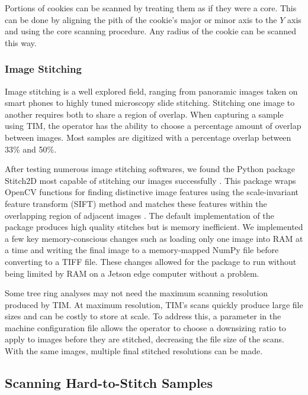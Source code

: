 \documentclass[a4paper,12pt]{article}
\begin{document}
Portions of cookies can be scanned by treating them as if they were a core. This can be done by aligning the pith of the cookie's major or minor axis to the $Y$ axis and using the core scanning procedure. Any radius of the cookie can be scanned this way.

\subsubsection{Image Stitching}

Image stitching is a well explored field, ranging from panoramic images taken on smart phones to highly tuned microscopy slide stitching. 
Stitching one image to another requires both to share a region of overlap. When capturing a sample using TIM, the operator has the ability to choose a percentage amount of overlap between images.
Most samples are digitized with a percentage overlap between 33\% and 50\%.

After testing numerous image stitching softwares, we found the Python package Stitch2D most capable of stitching our images successfully \citep{mansur_stitch2d_2022}. %
This package wraps OpenCV functions for finding distinctive image features using the scale-invariant feature transform (SIFT) method and matches these features within the overlapping region of adjacent images \citep{lowe_distinctive_2004}. 
The default implementation of the package produces high quality stitches but is memory inefficient. %
We implemented a few key memory-conscious changes such as loading only one image into RAM at a time and writing the final image to a memory-mapped NumPy file before converting to a TIFF file. These changes allowed for the package to run without being limited by RAM on a Jetson edge computer without a problem.

Some tree ring analyses may not need the maximum scanning resolution produced by TIM. At maximum resolution, TIM's scans quickly produce large file sizes and can be costly to store at scale. 
To address this, a parameter in the machine configuration file allows the operator to choose a downsizing ratio to apply to images before they are stitched, decreasing the file size of the scans.
With the same images, multiple final stitched resolutions can be made. 

\subsection{Scanning Hard-to-Stitch Samples} 
\end{document}
